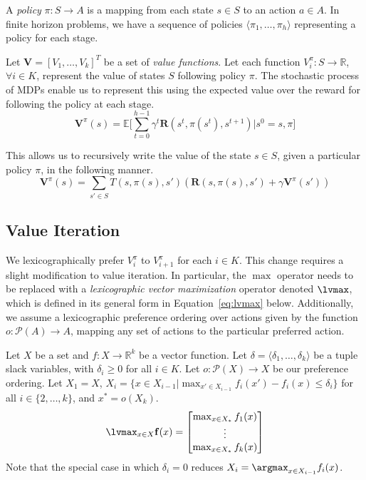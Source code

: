 A \emph{policy} $\pi : S \rightarrow A$ is a mapping from each state $s \in S$ to an action $a \in A$. In finite horizon problems, we have a sequence of policies $\langle \pi_1, \ldots, \pi_h \rangle$ representing a policy for each stage.

Let $\mathbf{V} = [V_1, \ldots, V_k]^T$ be a set of \emph{value functions}. Let each function $V_i^\pi : S \rightarrow \mathbb{R}$, $\forall i \in K$, represent the value of states $S$ following policy $\pi$. The stochastic process of MDPs enable us to represent this using the expected value over the reward for following the policy at each stage.
\begin{equation*}
    \mathbf{V}^\pi(s) = \mathbb{E} \Big[ \sum_{t=0}^{h-1} \gamma^t \mathbf{R}(s^t, \pi(s^t), s^{t+1}) \Big| s^0 = s, \pi \Big]
\end{equation*}

This allows us to recursively write the value of the state $s \in S$, given a particular policy $\pi$, in the following manner.
\begin{equation*}
    \mathbf{V}^\pi(s) = \sum_{s' \in S} T(s, \pi(s), s') (\mathbf{R}(s, \pi(s), s') + \gamma \mathbf{V}^\pi(s'))
\end{equation*}


\subsection{Value Iteration}

We lexicographically prefer $V_i^\pi$ to $V_{i+1}^\pi$ for each $i \in K$. This change requires a slight modification to value iteration. In particular, the $\max$ operator needs to be replaced with a \emph{lexicographic vector maximization} operator denoted $\lvmax$, which is defined in its general form in Equation~\ref{eq:lvmax} below. Additionally, we assume a lexicographic preference ordering over actions given by the function $o : \mathcal{P}(A) \rightarrow A$, mapping any set of actions to the particular preferred action.

Let $X$ be a set and $f : X \rightarrow \mathbb{R}^k$ be a vector function. Let $\delta = \langle \delta_1, \ldots, \delta_k \rangle$ be a tuple slack variables, with $\delta_i \geq 0$ for all $i \in K$. Let $o : \mathcal{P}(X) \rightarrow X$ be our preference ordering. Let $X_1 = X$, $X_i = \{x \in X_{i-1} | \max_{x' \in X_{i-1}} f_i(x') - f_i(x) \leq \delta_i \}$ for all $i \in \{2, \ldots, k\}$, and $x^* = o(X_k)$.
\begin{equation}
    \label{eq:lvmax}
    \lvmax_{x \in X} \mathbf{f}(x) = \begin{bmatrix}
            \max_{x \in X_*} f_1(x) \\
            \vdots \\
            \max_{x \in X_*} f_k(x)
        \end{bmatrix}
\end{equation}
Note that the special case in which $\delta_i = 0$ reduces $X_i = \argmax_{x \in X_{i-1}} f_i(x)$.


